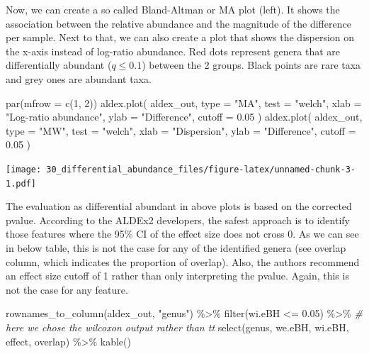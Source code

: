 \documentclass[
]{book}
\newenvironment{Shaded}{\begin{snugshade}}{\end{snugshade}}
\newcommand{\AttributeTok}[1]{\textcolor[rgb]{0.77,0.63,0.00}{#1}}
\newcommand{\CommentTok}[1]{\textcolor[rgb]{0.56,0.35,0.01}{\textit{#1}}}
\newcommand{\DecValTok}[1]{\textcolor[rgb]{0.00,0.00,0.81}{#1}}
\newcommand{\FloatTok}[1]{\textcolor[rgb]{0.00,0.00,0.81}{#1}}
\newcommand{\FunctionTok}[1]{\textcolor[rgb]{0.00,0.00,0.00}{#1}}
\newcommand{\NormalTok}[1]{#1}
\newcommand{\SpecialCharTok}[1]{\textcolor[rgb]{0.00,0.00,0.00}{#1}}
\newcommand{\StringTok}[1]{\textcolor[rgb]{0.31,0.60,0.02}{#1}}
\begin{document}
Now, we can create a so called Bland-Altman or MA plot (left). It shows the
association between the relative abundance and the magnitude of the difference
per sample. Next to that, we can also create a plot that shows the dispersion
on the x-axis instead of log-ratio abundance. Red dots represent genera that are
differentially abundant (\(q \leq 0.1\)) between the 2 groups. Black points are
rare taxa and grey ones are abundant taxa.

\begin{Shaded}
\begin{Highlighting}[]
\FunctionTok{par}\NormalTok{(}\AttributeTok{mfrow =} \FunctionTok{c}\NormalTok{(}\DecValTok{1}\NormalTok{, }\DecValTok{2}\NormalTok{))}
  \FunctionTok{aldex.plot}\NormalTok{(}
\NormalTok{    aldex\_out, }
    \AttributeTok{type =} \StringTok{"MA"}\NormalTok{, }
    \AttributeTok{test =} \StringTok{"welch"}\NormalTok{, }
    \AttributeTok{xlab =} \StringTok{"Log{-}ratio abundance"}\NormalTok{,}
    \AttributeTok{ylab =} \StringTok{"Difference"}\NormalTok{,}
    \AttributeTok{cutoff =} \FloatTok{0.05}
\NormalTok{  )}
  \FunctionTok{aldex.plot}\NormalTok{(}
\NormalTok{    aldex\_out, }
    \AttributeTok{type =} \StringTok{"MW"}\NormalTok{, }
    \AttributeTok{test =} \StringTok{"welch"}\NormalTok{,}
    \AttributeTok{xlab =} \StringTok{"Dispersion"}\NormalTok{,}
    \AttributeTok{ylab =} \StringTok{"Difference"}\NormalTok{,}
    \AttributeTok{cutoff =} \FloatTok{0.05}
\NormalTok{  )}
\end{Highlighting}
\end{Shaded}

\texttt{[image: 30\_differential\_abundance\_files/figure-latex/unnamed-chunk-3-1.pdf]}

The evaluation as differential abundant in above plots is based on the
corrected pvalue. According to the ALDEx2 developers, the safest approach is to
identify those features where the 95\% CI of the
effect size does not cross 0. As we can see in below table, this is not the
case for any of the identified
genera (see overlap column, which indicates the proportion of overlap). Also,
the authors recommend an effect
size cutoff of 1 rather than only interpreting the pvalue. Again, this is not
the case for any feature.

\begin{Shaded}
\begin{Highlighting}[]
\FunctionTok{rownames\_to\_column}\NormalTok{(aldex\_out, }\StringTok{"genus"}\NormalTok{) }\SpecialCharTok{\%\textgreater{}\%}
  \FunctionTok{filter}\NormalTok{(wi.eBH }\SpecialCharTok{\textless{}=} \FloatTok{0.05}\NormalTok{)  }\SpecialCharTok{\%\textgreater{}\%} \CommentTok{\# here we chose the wilcoxon output rather than tt}
  \FunctionTok{select}\NormalTok{(genus, we.eBH, wi.eBH, effect, overlap) }\SpecialCharTok{\%\textgreater{}\%}
  \FunctionTok{kable}\NormalTok{()}
\end{Highlighting}
\end{Shaded}
\end{document}
